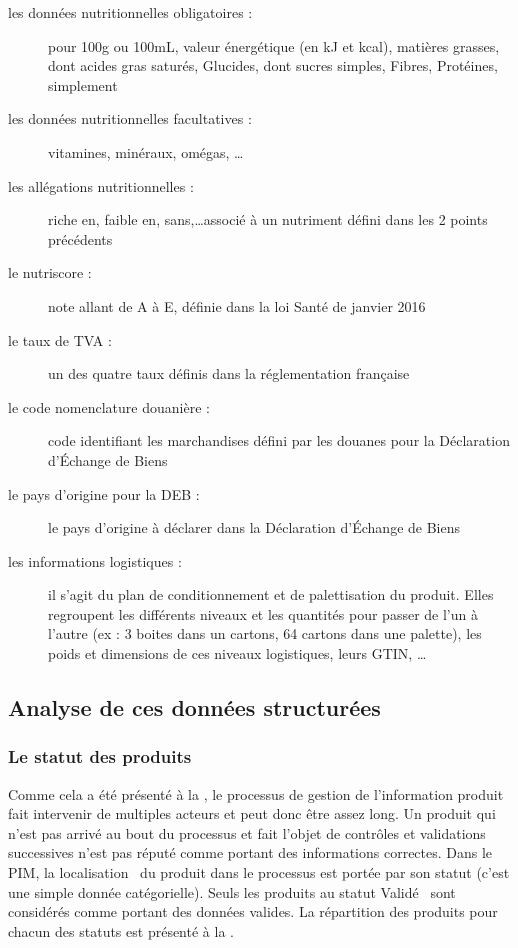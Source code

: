 \begin{description}
            \item[les données nutritionnelles obligatoires :] pour 100g ou 100mL, valeur énergétique (en kJ et kcal), matières grasses, dont acides gras saturés, Glucides, dont sucres simples, Fibres, Protéines, simplement
            \item[les données nutritionnelles facultatives :] vitamines, minéraux, omégas, \dots
            \item[les allégations nutritionnelles :] riche en, faible en, sans,\dots associé à un nutriment défini dans les 2 points précédents
            \item[le nutriscore :] note allant de A à E, définie dans la loi Santé de janvier 2016
            \item[le taux de TVA :] un des quatre taux définis dans la réglementation française
            \item[le code nomenclature douanière :] code identifiant les marchandises défini par les douanes pour la Déclaration d'\'{E}change de Biens~\cite{notions_DEB}
            \item[le pays d'origine pour la DEB :] le pays d'origine à déclarer dans la Déclaration d'\'{E}change de Biens~\cite{notions_DEB}
            \item[les informations logistiques :] il s'agit du plan de conditionnement et de palettisation du produit. Elles regroupent les différents niveaux et les quantités pour passer de l'un à l'autre (ex : 3 boites dans un cartons, 64 cartons dans une palette), les poids et dimensions de ces niveaux logistiques, leurs GTIN, \dots
        \end{description}
        
            \subsection{Analyse de ces données structurées}

                \subsubsection{Le statut des produits}\label{statuts}
                Comme cela a été présenté à la , le processus de gestion de l'information produit fait intervenir de multiples acteurs et peut donc être assez long.
                Un produit qui n'est pas arrivé au bout du processus et fait l'objet de contrôles et validations successives n'est pas réputé comme portant des informations correctes.
                Dans le PIM, la \og localisation \fg~du produit dans le processus est portée par son statut (c'est une simple donnée catégorielle).
                Seuls les produits au statut \og Validé \fg~sont considérés comme portant des données valides.
                La répartition des produits pour chacun des statuts est présenté à la .

